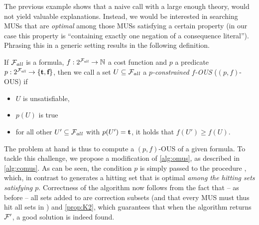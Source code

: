 The previous example shows that a naive \omus call with a large enough theory, would not yield valuable explanations.
Instead, we would be interested in searching MUSs that are \emph{optimal} among those MUSs satisfying a certain property (in our case this property is ``containing exactly one negation of a consequence literal''). 
Phrasing this in a generic setting results in the following definition.

\begin{definition}
    If $\mathcal{F} _{\mathit{all}}$ is a formula, $f:2^{\mathcal{F} _{\mathit{all}}} \to \mathbb{N}$ a cost function and  $p$ a predicate $p: 2^{\mathcal{F} _{\mathit{all}}}\to \{\textbf{t},\textbf{f}\}$, then we call a set $U\subseteq \mathcal{F} _{\mathit{all}}$ a \emph{$p$-constrained $f$-OUS} ($(p,f)$-OUS) if \begin{itemize}                                                                                                                                                                                                                         
    \item $U$ is unsatisfiable,
    \item $p(U)$ is true
    \item for all other $U'\subseteq \mathcal{F} _{\mathit{all}}$ with $p(U')=\textbf{t}$, it holds that $f(U')\geq f(U)$.                                                                                                                                                                                                                         \end{itemize}
\end{definition}

The problem at hand is thus to compute a $(p,f)$-OUS of a given formula. 
To tackle this challenge, we propose a modification of \cref{alg:omus}, as described in \cref{alg:comus}. 
As can be seen, the condition $p$ is simply passed to the procedure \cohs, which, in contrast to \ohs generates a hitting set that is optimal \emph{among the hitting sets satisfying $p$}. Correctness of the algorithm now follows from the fact that -- as before -- all sets added to \setstohit are correction subsets (and that every MUS must thus hit all sets in \setstohit) and \cref{prop:K2}, which guarantees that when the algorithm returns $\mathcal{F} '$, a good solution is indeed found.  

